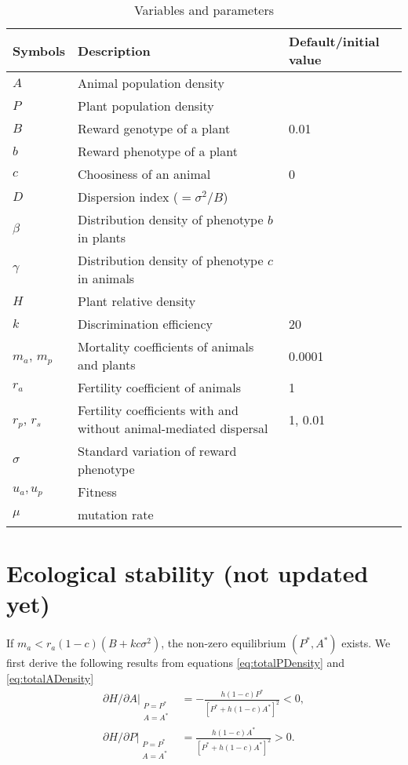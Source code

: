 \documentclass[12pt]{article}
\begin{document}
\clearpage
\begin{table*}
		\centering
		\caption{Variables and parameters}
		\begin{tabular}[htb]{lll} \hline
		Symbols	& Description & Default/initial value \\ \hline
		$A$			& Animal population density & \\
		$P$			& Plant population density & \\
		$B$			& Reward genotype of a plant & 0.01 \\
		$b$			& Reward phenotype of a plant & \\
		$c$			& Choosiness of an animal & 0\\
		$D$			& Dispersion index ($=\sigma^2/B$) & \\
		$\beta$		& Distribution density of phenotype $b$ in plants &\\
		$\gamma$	& Distribution density of phenotype $c$ in animals &\\
		$H$			& Plant relative density &\\
		$k$			& Discrimination efficiency& 20\\
		$m_a$, $m_p$& Mortality coefficients of animals and plants & 0.0001\\		
		$r_a$		& Fertility coefficient of animals & 1\\
		$r_p$, $r_s$& Fertility coefficients with and without animal-mediated dispersal & 1, 0.01 \\
		$\sigma$	& Standard variation of reward phenotype &\\
		$u_a, u_p$	& Fitness &\\
		$\mu$		& mutation rate &\\
		
		\hline
		\end{tabular}
		\label{tab:VariablesAndParameters}
\end{table*}


\clearpage
\appendix
\appendixpage

\section{Ecological stability (not updated yet)}
\setcounter{equation}{0}

If $m_a<r_a(1-c)(B+k c \sigma^2)$, the non-zero equilibrium $(P^*, A^*)$ exists. We first derive the following results from equations \eqref{eq:totalPDensity} and \eqref{eq:totalADensity}
\begin{align}
\left.\partial H/\partial A \right|_{\substack{P=P^*\\ A=A^*}}&= -\frac{h (1-c) P^*}{[P^*+h(1-c)A^*]^2}<0, \nonumber \\
\left.\partial H/\partial P \right|_{\substack{P=P^*\\ A=A^*}}&= \frac{h (1-c) A^*}{[P^*+h (1-c) A^*]^2}>0 . \nonumber
\end{align}
\end{document}
